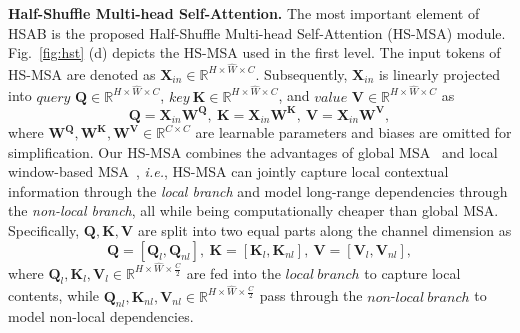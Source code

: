\documentclass{article}
\begin{document}
\textbf{Half-Shuffle Multi-head Self-Attention.} The most important element of HSAB is the proposed Half-Shuffle Multi-head Self-Attention (HS-MSA) module. Fig.~\ref{fig:hst} (d) depicts the HS-MSA used in the first level. The input tokens of HS-MSA are denoted as $\mathbf{X}_{in}\in \mathbb{R}^{H\times \hat{W}\times C}$.  Subsequently,  $\mathbf{X}_{in}$ is linearly projected into $query$ $\mathbf{Q}\in \mathbb{R}^{H\times \hat{W}\times C}$, $key~\mathbf{K} \in \mathbb{R}^{H\times \hat{W}\times C}$, and $value$ $\mathbf{V}\in \mathbb{R}^{H\times \hat{W}\times C}$ as
\begin{equation}
	\mathbf{Q}=\mathbf{X}_{in}\mathbf{W^Q},
	~\mathbf{K}=\mathbf{X}_{in}\mathbf{W^K},
	~\mathbf{V}=\mathbf{X}_{in}\mathbf{W^V},
	\label{eq:linear_proj}
\end{equation}
where $\mathbf{W^Q},\mathbf{W^K},\mathbf{W^V}\in \mathbb{R}^{C\times C}$ are learnable parameters and biases are omitted for simplification. Our HS-MSA combines the advantages of global MSA~\cite{global_msa} and local window-based MSA~\cite{liu2021swin}, \emph{i.e.}, HS-MSA can jointly capture local contextual information through the \emph{local branch} and model long-range dependencies through the \emph{non-local branch}, all while being computationally cheaper than global MSA. Specifically,  $\mathbf{Q},\mathbf{K},\mathbf{V}$ are split into two equal parts along the channel dimension as
\begin{equation}
	\mathbf{Q} = [\mathbf{Q}_l, \mathbf{Q}_{nl}], 
	~\mathbf{K} = [\mathbf{K}_l, \mathbf{K}_{nl}], 
	~\mathbf{V} = [\mathbf{V}_l, \mathbf{V}_{nl}],
	\label{eq:half_split}
\end{equation}
where $\mathbf{Q}_l, \mathbf{K}_l, \mathbf{V}_l\in \mathbb{R}^{H\times \hat{W}\times \frac{C}{2}}$ are fed into the $local~branch$ to capture local contents, while  $\mathbf{Q}_{nl}, \mathbf{K}_{nl}, \mathbf{V}_{nl}\in \mathbb{R}^{H\times \hat{W}\times \frac{C}{2}}$ pass through the $non$-$local~branch$ to model non-local dependencies.
\end{document}

